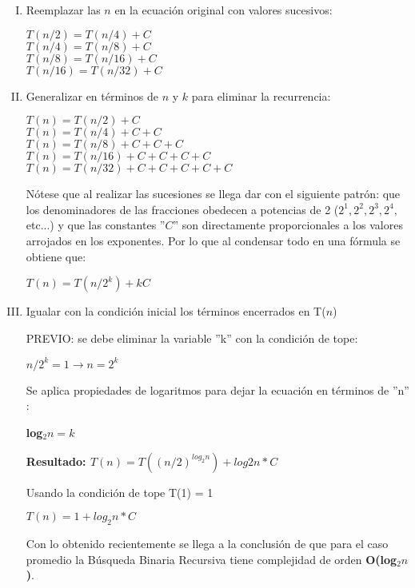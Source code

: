 \begin{enumerate}[I. ]

\item Reemplazar las $n$ en la ecuación original con valores sucesivos:

\begin{center}
$T(n/2) = T(n/4) + C$\\
$T(n/4) = T(n/8) + C$\\
$T(n/8) = T(n/16) + C$\\
$T(n/16) = T(n/32) + C$
\end{center}

\item Generalizar en términos de $n$ y $k$ para eliminar la recurrencia:

\begin{center}
$T(n) = T(n/2) + C$\\
$T(n) = T(n/4) + C + C$\\
$T(n) = T(n/8) + C + C + C$\\
$T(n) = T(n/16) + C + C + C + C$\\
$T(n) = T(n/32) + C + C + C + C + C$
\end{center}

Nótese que al realizar las sucesiones se llega dar con el siguiente patrón: que los denominadores de las fracciones obedecen a potencias de 2 ($2^1, 2^2, 2^3, 2^4, $etc...) y que las constantes ''$C$'' son directamente proporcionales a los valores arrojados en los exponentes. Por lo que al condensar todo en una fórmula se obtiene que:

{\centerline{ \bfseries $T(n) = T(n/2^k) + kC$} }

\item Igualar con la condición inicial los términos encerrados en T($n$)

PREVIO: se debe eliminar la variable ''k'' con la condición de tope:

{\centerline{ \textbf{$n/2^k = 1 \rightarrow n = 2^k$}} }

Se aplica propiedades de logaritmos para dejar la ecuación en términos de ''n'' :

{\centerline{ \textbf{log$_2 n = k$}} }

{\centerline{ \textbf{Resultado: $T(n) = T( (n/2)^{log_2 n}) + log2n * C$}} }

Usando la condición de tope T(1) = 1

{\centerline{ \textbf{$T(n) = 1 + log_2 n * C$}} }

Con lo obtenido recientemente se llega a la conclusión de que para el caso promedio la Búsqueda Binaria Recursiva tiene complejidad de orden \textbf{O(log$_2 n$)}.




\end{enumerate}